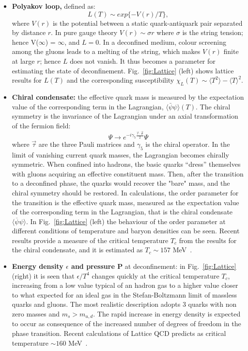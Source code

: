 \begin{itemize}
\item \textbf{Polyakov loop,} defined as:
\begin{equation}
L(T)\sim exp\{-V(r)/T\},
\end{equation}
where $V(r)$ is the potential between a static quark-antiquark pair separated by distance $r$. 
In pure gauge theory $V(r)\sim \sigma r$ where $\sigma$ is the string tension; hence V($\infty$) = $\infty$, 
and $L = 0$. In a deconfined medium, colour screening among the gluons leads to a melting of the 
string, which makes $V(r)$ finite at large $r$; hence $L$ does not vanish. It thus becomes a parameter 
for estimating the state of deconfinement. Fig.~\ref{fig:Lattice} (left) shows lattice results for $L(T)$ and the 
corresponding susceptibility $\chi_L(T)\sim \langle T^2 \rangle - \langle T \rangle ^2$. 
\item \textbf{Chiral condensate: }the effective quark mass is measured by the expectation value 
of the corresponding term in the Lagrangian, $\langle  \bar{\psi}\psi\rangle (T)$. The chiral symmetry is the invariance of the Lagrangian under an axial transformation of the fermion field:
\begin{equation}
\Psi \rightarrow e^{-i \gamma_{5} \frac{\vec{\tau} \cdot \vec{\theta}}{2}}\Psi
\end{equation}
where $\vec{\tau}$ are the three Pauli matrices and $\gamma_5$ is the chiral operator. In the limit of 
vanishing current quark masses, the Lagrangian becomes chirally symmetric. When confined into 
hadrons, the basic quarks ``dress'' themselves with gluons acquiring an effective constituent mass. 
Then, after the transition to a deconfined phase, the quarks would recover the "bare" mass, and the 
chiral symmetry should be restored. In calculations, the order parameter for the transition is the effective 
quark mass, measured as the expectation value of the corresponding term in the Lagrangian, that is the 
chiral condensate $\langle \overline{\psi}\psi \rangle$. In Fig.~\ref{fig:Lattice} (left) the behaviour of 
the order parameter at different conditions of temperature and baryon densities can be seen. 
Recent results provide a measure of the critical temperature $T_c$ from the results for the chiral condensate, 
and it is estimated as $T_c \sim 157 $ MeV~\cite{Borsanyi:2011bn}.
\item \textbf{Energy density $\epsilon$ and pressure P} at deconfinement: in Fig.~\ref{fig:Lattice} (right) it 
is seen that $\epsilon/T^4$ changes quickly at the critical temperature $T_c$, increasing from a low 
value typical of an hadron gas to a higher value closer to what expected for an ideal gas in the Stefan-Boltzmann limit of 
massless quarks and gluons. The most realistic description adopts 3 quarks with non zero masses and $m_s > m_{u,d}$. 
The rapid increase in energy density is expected to occur as consequence of the increased number of degrees of 
freedom in the phase transition. Recent calculations of Lattice QCD predicts as critical temperature $ \sim 160$ MeV~\cite{Karsch:2001vs}.

\end{itemize}


